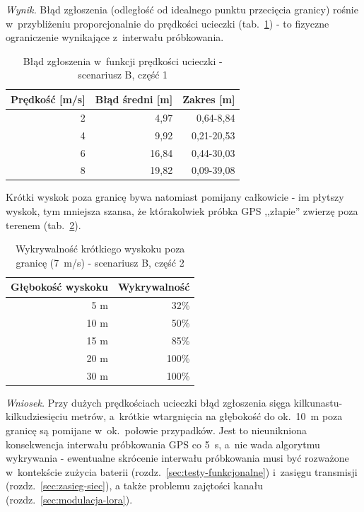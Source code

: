 \textit{Wynik.} Błąd zgłoszenia (odległość od idealnego punktu przecięcia granicy) rośnie
w~przybliżeniu proporcjonalnie do prędkości ucieczki (tab.~\ref{tab:scenariusz-b-predkosc}) - to
fizyczne ograniczenie wynikające z~interwału próbkowania.

\begin{table}[!h]
    \caption{Błąd zgłoszenia w~funkcji prędkości ucieczki - scenariusz B, część 1}
    \label{tab:scenariusz-b-predkosc}
    \centering
    \begin{tabular}{|r|r|r|}
        \hline
        \textbf{Prędkość [m/s]} & \textbf{Błąd średni [m]} & \textbf{Zakres [m]} \\
        \hline
        2 & 4,97  & 0,64-8,84 \\
        4 & 9,92  & 0,21-20,53 \\
        6 & 16,84 & 0,44-30,03 \\
        8 & 19,82 & 0,09-39,08 \\
        \hline
    \end{tabular}
\end{table}

Krótki wyskok poza granicę bywa natomiast pomijany całkowicie - im płytszy wyskok, tym mniejsza
szansa, że którakolwiek próbka GPS ,,złapie'' zwierzę poza terenem (tab.~\ref{tab:scenariusz-b-wyskok}). 

\begin{table}[!h]
    \caption{Wykrywalność krótkiego wyskoku poza granicę (7~m/s) - scenariusz B, część 2}
    \label{tab:scenariusz-b-wyskok}
    \centering
    \begin{tabular}{|r|r|}
        \hline
        \textbf{Głębokość wyskoku} & \textbf{Wykrywalność} \\
        \hline
        5 m  & 32\% \\
        10 m & 50\% \\
        15 m & 85\% \\
        20 m & 100\% \\
        30 m & 100\% \\
        \hline
    \end{tabular}
\end{table}

\textit{Wniosek.} Przy dużych prędkościach ucieczki błąd zgłoszenia sięga kilkunastu-kilkudziesięciu
metrów, a~krótkie wtargnięcia na głębokość do ok.\ 10~m poza granicę są pomijane w~ok.\ połowie
przypadków. Jest to nieunikniona konsekwencja interwału próbkowania GPS co 5~s, a~nie wada
algorytmu wykrywania - ewentualne skrócenie interwału próbkowania musi być rozważone w~kontekście
zużycia baterii (rozdz.~\ref{sec:testy-funkcjonalne}) i~zasięgu transmisji (rozdz.~\ref{sec:zasieg-siec}), a także problemu zajętości kanału (rozdz.~\ref{sec:modulacja-lora}).

